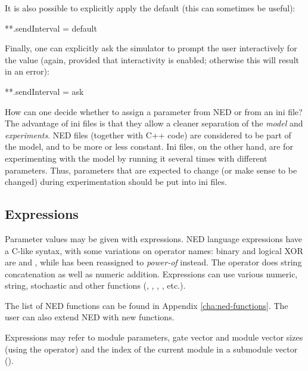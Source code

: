 It is also possible to explicitly apply the default (this can sometimes
be useful):

\begin{inifile}
**.sendInterval = default
\end{inifile}

Finally, one can explicitly ask the simulator to prompt the user interactively
for the value (again, provided that interactivity is enabled; otherwise
this will result in an error):

\begin{inifile}
**.sendInterval = ask
\end{inifile}

\begin{note}
    How can one decide whether to assign a parameter from NED or from an ini
    file? The advantage of ini files is that they allow a cleaner separation of the \textit{model}
    and \textit{experiments}. NED files (together with C++ code) are considered
    to be part of the model, and to be more or less constant. Ini files, on
    the other hand, are for experimenting with the model by running it
    several times with different parameters. Thus, parameters that are expected
    to change (or make sense to be changed) during experimentation should be
    put into ini files.
\end{note}


\subsection{Expressions}
\label{sec:ned-lang:expressions}

Parameter values may be given with expressions. NED language expressions
have a C-like syntax, with some variations on operator names: binary and
logical XOR are \ttt{\#} and \ttt{\#\#}, while \ttt{\^} has been reassigned
to \textit{power-of} instead. The \ttt{+} operator does string
concatenation as well as numeric addition. Expressions can use various
numeric, string, stochastic and other functions (, ,
, , etc.).

\begin{note}
    The list of NED functions can be found in Appendix \ref{cha:ned-functions}.
    The user can also extend NED with new functions.
\end{note}


Expressions may refer to module parameters, gate vector and module vector sizes
(using the  operator) and the index of the current module
in a submodule vector ().

